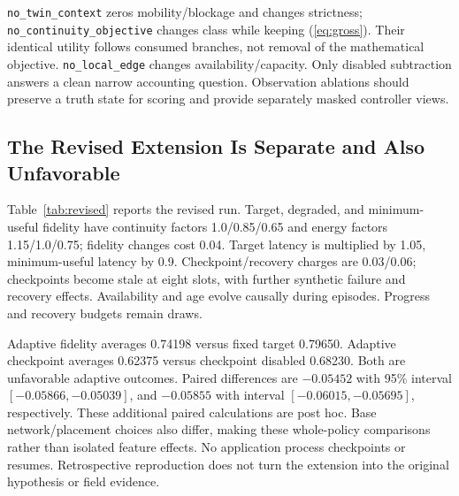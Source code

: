 \documentclass[10pt,twocolumn]{article}
\newcommand{\pol}[1]{\texttt{#1}}
\begin{document}
\begin{table}[t]
\caption{Original procedural interventions. Several change scoring inputs and are not isolated observation ablations.}\label{tab:ablation}
\centering\small
\end{table}

\pol{no\_twin\_context} zeros mobility/blockage and changes strictness; \pol{no\_continuity\_objective} changes class while keeping (\ref{eq:gross}). Their identical utility follows consumed branches, not removal of the mathematical objective. \pol{no\_local\_edge} changes availability/capacity. Only disabled subtraction answers a clean narrow accounting question. Observation ablations should preserve a truth state for scoring and provide separately masked controller views.

\subsection{The Revised Extension Is Separate and Also Unfavorable}
Table~\ref{tab:revised} reports the revised run. Target, degraded, and minimum-useful fidelity have continuity factors 1.0/0.85/0.65 and energy factors 1.15/1.0/0.75; fidelity changes cost 0.04. Target latency is multiplied by 1.05, minimum-useful latency by 0.9. Checkpoint/recovery charges are 0.03/0.06; checkpoints become stale at eight slots, with further synthetic failure and recovery effects. Availability and age evolve causally during episodes. Progress and recovery budgets remain draws.

\begin{table}[t]
\caption{Revised held-out results, five seeds. Do not pool with Table~\ref{tab:heldout}.}\label{tab:revised}
\centering\scriptsize
\end{table}

Adaptive fidelity averages 0.74198 versus fixed target 0.79650. Adaptive checkpoint averages 0.62375 versus checkpoint disabled 0.68230. Both are unfavorable adaptive outcomes. Paired differences are $-0.05452$ with 95\% interval $[-0.05866,-0.05039]$, and $-0.05855$ with interval $[-0.06015,-0.05695]$, respectively. These additional paired calculations are post hoc. Base network/placement choices also differ, making these whole-policy comparisons rather than isolated feature effects. No application process checkpoints or resumes. Retrospective reproduction does not turn the extension into the original hypothesis or field evidence.
\end{document}
